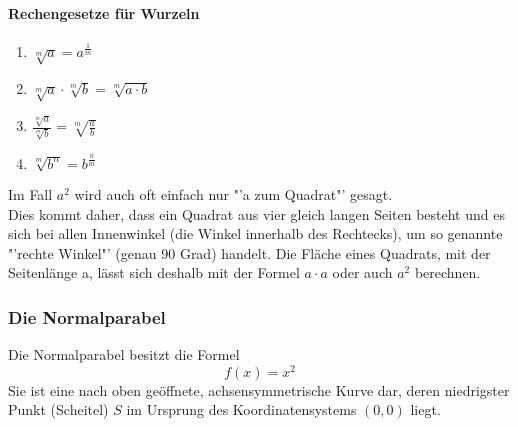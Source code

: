 \paragraph{Rechengesetze für Wurzeln}
\begin{enumerate}
	\item $\sqrt[m]{a} = a^{\frac{1}{m}}$
	\item $\sqrt[m]{a} \cdot \sqrt[m]{b} = \sqrt[m]{a \cdot b}$
	\item $\frac{\sqrt[m]{a}}{\sqrt[m]{b}} = \sqrt[m]{\frac{a}{b}}$
	\item $\sqrt[m]{b^n} = b^{\frac{n}{m}}$
\end{enumerate}\vline

\noindent Im Fall $a^2$ wird auch oft einfach nur "'a zum Quadrat"' gesagt.\\
Dies kommt daher, dass ein Quadrat aus vier gleich langen Seiten besteht und es sich bei allen Innenwinkel (die Winkel innerhalb des Rechtecks), um so genannte "'rechte Winkel"' (genau 90 Grad) handelt. Die Fläche eines Quadrats, mit der Seitenlänge a, lässt sich deshalb mit der Formel $a \cdot a$ oder auch $a^2$ berechnen.

\subsubsection{Die Normalparabel}
Die Normalparabel besitzt die Formel 
\begin{equation*}
f(x) = x^2
\end{equation*}
Sie ist eine nach oben geöffnete, achsensymmetrische Kurve dar, deren niedrigster Punkt (Scheitel) $S$ im Ursprung des Koordinatensystems $(0,0)$ liegt.


